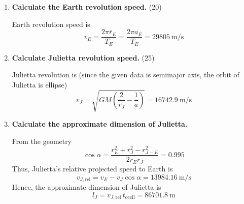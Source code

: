 \begin{enumerate}
\item \textbf{Calculate the Earth revolution speed.} \hfill(20)

  Earth revolution speed is
  \[
  v_E = \frac{2\pi \bar r_E}{T_E} = \frac{2\pi a_E}{T_E} = 29805~\mathrm{m/s}
  \]
\item \textbf{Calculate Julietta revolution speed.} \hfill(25)

  Julietta revolution is (since the given data is semimajor axis, the orbit of
  Julietta is ellipse)
  \[
  v_J = \sqrt{GM\left(\frac{2}{r_J} - \frac{1}{a}\right)} = 16742.9~\mathrm{m/s}
  \]
\item \textbf{Calculate the approximate dimension of Julietta.}

  From the geometry
  \[
  \cos\alpha = \frac{r_E^2 + r_J^2 - r_{J-E}^2}{2 r_E r_J} = 0.995
  \]
  Thus, Julietta's relative projected speed to Earth is
  \[
  v_{J,\mathrm{rel}} = v_E - v_J\cos\alpha = 13984.16~\mathrm{m/s} \tag*{(40)}
  \]
  Hence, the approximate dimension of Julietta is
  \[
  l_J = v_{J,\mathrm{rel}}\,t_{\mathrm{occil}} = 86701.8~\mathrm{m} \tag*{(15)}
  \]
\end{enumerate}
